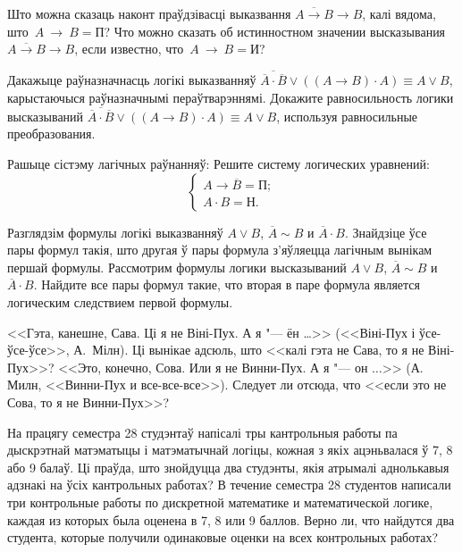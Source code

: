 \begin{problemList}

\problemItemSimple
{Што можна сказаць наконт праўдзівасці выказвання  $\overline{A \to B} \to B$, калі вядома, што~$A~\to~B = \mbox{П}$?}
{Что можно сказать об истинностном значении высказывания $\overline{A \to B} \to B$, если известно, что~$A~\to~B = \mbox{И}$?}

\bigskip

\problemItemSimple
{Дакажыце раўназначнасць логікі выказванняў $\overline{\overline{A} \cdot \overline{B}} \vee ((A \to B) \cdot A) \equiv A \vee B$,
карыстаючыся раўназначнымі пераўтварэннямі.}
{Докажите равносильность логики высказываний $\overline{\overline{A} \cdot \overline{B}} \vee ((A \to B) \cdot A) \equiv A \vee B$,
используя равносильные преобразования.}

\bigskip

\problemItemWithCommonPart
{Рашыце сістэму лагічных раўнанняў:}
{Решите систему логических уравнений:}
{\[\begin{cases} A \to \overline{B} = \mbox{П}; \\ A \cdot B = \mbox{Н}. \end{cases}\]}

\smallskip

\problemItemSimple
{Разглядзім формулы логікі выказванняў $A \vee B$, $\overline{A} \sim B$ и $\overline{A} \cdot B$.
Знайдзіце ўсе пары формул такія, што другая ў пары формула з'яўляецца лагічным вынікам першай формулы.}
{Рассмотрим формулы логики высказываний $A \vee B$, $\overline{A} \sim B$ и $\overline{A} \cdot B$.
Найдите все пары формул такие, что вторая в паре формула является логическим следствием первой формулы.}

\bigskip

\problemItemSimple
{<<Гэта, канешне, Сава. Ці я не Віні-Пух. А я "--- ён \dots>> (<<Віні-Пух і ўсе-ўсе-ўсе>>, А.~Мілн).
Ці вынікае адсюль, што <<калі гэта не Сава, то я не Віні-Пух>>?}
{<<Это, конечно, Сова. Или я не Винни-Пух. А я "--- он $\ldots$>> (А. Милн, <<Винни-Пух и все-все-все>>).
Следует ли отсюда, что <<если это не Сова, то я не Винни-Пух>>?}

\bigskip

\problemItemSimple
{На працягу семестра 28 студэнтаў напісалі тры кантрольныя работы па дыскрэтнай матэматыцы і матэматычнай логіцы,
кожная з якіх ацэньвалася ў 7, 8 або 9 балаў.
Ці праўда, што знойдуцца два студэнты, якія атрымалі аднолькавыя адзнакі на ўсіх кантрольных работах?}
{В течение семестра 28 студентов написали три контрольные работы по дискретной математике и математической логике,
каждая из которых была оценена в 7, 8 или 9 баллов.
Верно ли, что найдутся два студента, которые получили одинаковые оценки на всех контрольных работах?}


\end{problemList}
